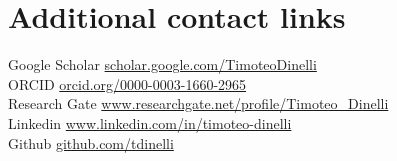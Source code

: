 \section{\sc Additional contact links}

Google Scholar \hfill
\href{https://scholar.google.com/citations?user=H117wUwAAAAJ&hl=it&oi=ao}{scholar.google.com/TimoteoDinelli}\\
ORCID \hfill
\href{https://orcid.org/0000-0003-1660-2965}{orcid.org/0000-0003-1660-2965}\\
Research Gate \hfill
\href{https://www.researchgate.net/profile/Timoteo_Dinelli}{www.researchgate.net/profile/Timoteo\_Dinelli}\\
Linkedin\hfill
\href{https://www.linkedin.com/in/timoteo-dinelli/}{www.linkedin.com/in/timoteo-dinelli}\\
Github \hfill \href{https://github.com/tdinelli}{github.com/tdinelli}

